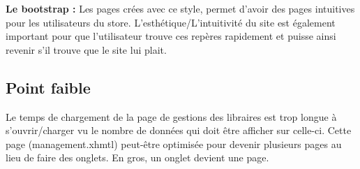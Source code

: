 	\textbf{Le bootstrap :} Les pages crées avec ce style, permet d'avoir des pages intuitives pour les utilisateurs du store. L'esthétique/L'intuitivité du site est également important pour que l'utilisateur trouve ces repères rapidement et puisse ainsi revenir s'il trouve que le site lui plait. 
 
	\subsection{Point faible}
	Le temps de chargement de la page de gestions des libraires est trop longue à s'ouvrir/charger vu le nombre de données qui doit être afficher sur celle-ci. 
	Cette page (management.xhmtl) peut-être optimisée pour devenir plusieurs pages au lieu de faire des onglets. En gros, un onglet devient une page. 